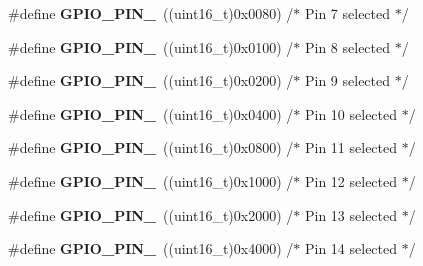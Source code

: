 \begin{DoxyCompactItemize}
\item 
\hypertarget{group___g_p_i_o__pins_ga482cb86c2f036e630661a41e8986bcfe}{\#define {\bfseries G\-P\-I\-O\-\_\-\-P\-I\-N\-\_}~((uint16\-\_\-t)0x0080)  /$\ast$ Pin 7 selected    $\ast$/}\label{group___g_p_i_o__pins_ga482cb86c2f036e630661a41e8986bcfe}

\item 
\hypertarget{group___g_p_i_o__pins_gaf5eb6a42a4428e236bd4fd08ade71e7a}{\#define {\bfseries G\-P\-I\-O\-\_\-\-P\-I\-N\-\_}~((uint16\-\_\-t)0x0100)  /$\ast$ Pin 8 selected    $\ast$/}\label{group___g_p_i_o__pins_gaf5eb6a42a4428e236bd4fd08ade71e7a}

\item 
\hypertarget{group___g_p_i_o__pins_ga4c503cb4a0dc0d18261080051d9c2daf}{\#define {\bfseries G\-P\-I\-O\-\_\-\-P\-I\-N\-\_}~((uint16\-\_\-t)0x0200)  /$\ast$ Pin 9 selected    $\ast$/}\label{group___g_p_i_o__pins_ga4c503cb4a0dc0d18261080051d9c2daf}

\item 
\hypertarget{group___g_p_i_o__pins_gac102c0123cb8bcadc5b590cd940b9e20}{\#define {\bfseries G\-P\-I\-O\-\_\-\-P\-I\-N\-\_}~((uint16\-\_\-t)0x0400)  /$\ast$ Pin 10 selected   $\ast$/}\label{group___g_p_i_o__pins_gac102c0123cb8bcadc5b590cd940b9e20}

\item 
\hypertarget{group___g_p_i_o__pins_ga79f6797ea82c1fb25cd6c0e14e44d312}{\#define {\bfseries G\-P\-I\-O\-\_\-\-P\-I\-N\-\_}~((uint16\-\_\-t)0x0800)  /$\ast$ Pin 11 selected   $\ast$/}\label{group___g_p_i_o__pins_ga79f6797ea82c1fb25cd6c0e14e44d312}

\item 
\hypertarget{group___g_p_i_o__pins_ga95f9ce5911fa8b209defb969db93ced3}{\#define {\bfseries G\-P\-I\-O\-\_\-\-P\-I\-N\-\_}~((uint16\-\_\-t)0x1000)  /$\ast$ Pin 12 selected   $\ast$/}\label{group___g_p_i_o__pins_ga95f9ce5911fa8b209defb969db93ced3}

\item 
\hypertarget{group___g_p_i_o__pins_ga173023dced8f9692ade0f1176558ef70}{\#define {\bfseries G\-P\-I\-O\-\_\-\-P\-I\-N\-\_}~((uint16\-\_\-t)0x2000)  /$\ast$ Pin 13 selected   $\ast$/}\label{group___g_p_i_o__pins_ga173023dced8f9692ade0f1176558ef70}

\item 
\hypertarget{group___g_p_i_o__pins_ga315b4dc1a0c1f9021b3d3a8fe9ccc0c3}{\#define {\bfseries G\-P\-I\-O\-\_\-\-P\-I\-N\-\_}~((uint16\-\_\-t)0x4000)  /$\ast$ Pin 14 selected   $\ast$/}\label{group___g_p_i_o__pins_ga315b4dc1a0c1f9021b3d3a8fe9ccc0c3}


\end{DoxyCompactItemize}
